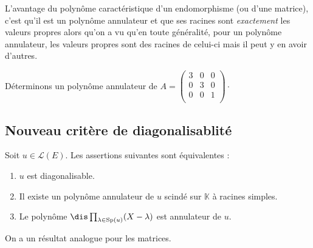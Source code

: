 \documentclass[a4paper,10pt]{report}
\begin{document}
 \begin{rem} L'avantage du polynôme caractéristique d'un endomorphisme (ou d'une matrice), c'est qu'il est un polynôme annulateur et que ses racines sont \textit{exactement} les valeurs propres alors qu'on a vu qu'en toute généralité, pour un polynôme annulateur, les valeurs propres sont des racines de celui-ci mais il peut y en avoir d'autres.
 \end{rem}
 
 \begin{ex} Déterminons un polynôme annulateur de $A = \begin{pmatrix}
 3 & 0 & 0 \\
 0 & 3 & 0\\
 0 & 0 & 1 \\
 \end{pmatrix}\cdot$
 
 \vspace{7cm}
% 
 \end{ex}
 
 \subsection{Nouveau critère de diagonalisablité}
 
 \begin{thm} Soit $u \in \mathcal{L}(E)$. Les assertions suivantes sont équivalentes :
 
 \begin{enumerate}
 \item $u$ est diagonalisable.
 \item Il existe un polynôme annulateur de $u$ scindé sur $\mathbb{K}$ à racines simples.
 \item Le polynôme $\dis \prod_{ \lambda \in \textrm{Sp}(u)} (X-\lambda)$ est annulateur de $u$.
 \end{enumerate}
 On a un résultat analogue pour les matrices.
 \end{thm}
 
\end{document}

